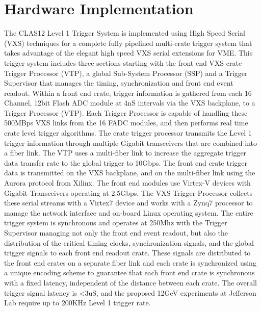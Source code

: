 \section{Hardware Implementation}

The CLAS12 Level 1 Trigger System is implemented using High Speed Serial (VXS) techniques for a complete fully pipelined multi-crate trigger system that takes advantage of the elegant high speed VXS serial extensions for VME.  This trigger system includes three sections starting with the front end VXS crate Trigger Processor (VTP), a global Sub-System Processor (SSP) and a Trigger Supervisor that manages the timing, synchronization and front end event readout.  
Within a front end crate, trigger information is gathered from each 16 Channel, 12bit Flash ADC module at 4nS intervals via the VXS backplane, to a Trigger Processor (VTP).  Each Trigger Processor is capable of handling these 500MBps VXS links from the 16 FADC modules, and then performs real time crate level trigger algorithms.  The crate trigger processor transmits the Level 1 trigger information through multiple Gigabit transceivers that are combined into a fiber link.  The VTP uses a multi-fiber link to increase the aggregate trigger data transfer rate to the global trigger to 10Gbps.
The front end crate trigger data is transmitted on the VXS backplane, and on the multi-fiber link using the Aurora protocol from Xilinx.  The front end modules use Virtex-V devices with Gigabit Transceivers operating at 2.5Gbps. The VXS Trigger Processor collects these serial streams with a Virtex7 device and works with a Zynq7 processor to manage the network interface and on-board Linux operating system.
The entire trigger system is synchronous and operates at 250Mhz with the Trigger Supervisor managing not only the front end event readout, but also the distribution of the critical timing clocks, synchronization signals, and the global trigger signals to each front end readout crate.  These signals are distributed to the front end crates on a separate fiber link and each crate is synchronized using a unique encoding scheme to guarantee that each front end crate is synchronous with a fixed latency, independent of the distance between each crate.  The overall trigger signal latency is <3uS, and the proposed 12GeV experiments at Jefferson Lab require up to 200KHz Level 1 trigger rate.


